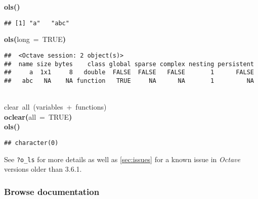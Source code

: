 \documentclass[english,10pt,a4paper]{article}\usepackage{graphicx, color}
\makeatletter
\newcommand{\hlnumber}[1]{\textcolor[rgb]{0,0,0}{#1}}%
\newcommand{\hlfunctioncall}[1]{\textcolor[rgb]{0.501960784313725,0,0.329411764705882}{\textbf{#1}}}%
\newcommand{\hlkeyword}[1]{\textcolor[rgb]{0,0,0}{\textbf{#1}}}%
\newcommand{\hlargument}[1]{\textcolor[rgb]{0.690196078431373,0.250980392156863,0.0196078431372549}{#1}}%
\newcommand{\hlcomment}[1]{\textcolor[rgb]{0.180392156862745,0.6,0.341176470588235}{#1}}%
\newcommand{\hlstd}[1]{\textcolor[rgb]{0,0,0}{#1}}%
\newenvironment{kframe}{%
 \def\FrameCommand##1{\hskip\@totalleftmargin \hskip-\fboxsep
 \colorbox{shadecolor}{##1}\hskip-\fboxsep
     \hskip-\linewidth \hskip-\@totalleftmargin \hskip\columnwidth}%
 \MakeFramed {\advance\hsize-\width
   \@totalleftmargin\z@ \linewidth\hsize
   \@setminipage}}%
 {\par\unskip\endMakeFramed}
\newenvironment{knitrout}{}{} %
\let\proglang=\textit
\let\code=\texttt
\newcommand{\octave}{\proglang{Octave}\xspace}
\makeatother
\begin{document}
\begin{knitrout}
\color{fgcolor}\begin{kframe}
\begin{flushleft}
\ttfamily\noindent
\hlfunctioncall{o\usebox{\hlnormalsizeboxunderscore}ls}\hlkeyword{(}\hlkeyword{)}\mbox{}
\normalfont
\end{flushleft}
\begin{verbatim}
## [1] "a"   "abc"
\end{verbatim}
\begin{flushleft}
\ttfamily\noindent
\hlfunctioncall{o\usebox{\hlnormalsizeboxunderscore}ls}\hlkeyword{(}\hlargument{long}{\ }\hlargument{=}{\ }\hlnumber{TRUE}\hlkeyword{)}\mbox{}
\normalfont
\end{flushleft}
\begin{verbatim}
##  <Octave session: 2 object(s)>
##  name size bytes    class global sparse complex nesting persistent
##     a  1x1     8   double  FALSE  FALSE   FALSE       1      FALSE
##   abc   NA    NA function   TRUE     NA      NA       1         NA
\end{verbatim}
\begin{flushleft}
\ttfamily\noindent
\hspace*{\fill}\\
\hlstd{}\hlcomment{\usebox{\hlnormalsizeboxhash}{\ }clear{\ }all{\ }(variables{\ }+{\ }functions)}\hspace*{\fill}\\
\hlstd{}\hlfunctioncall{o\usebox{\hlnormalsizeboxunderscore}clear}\hlkeyword{(}\hlargument{all}{\ }\hlargument{=}{\ }\hlnumber{TRUE}\hlkeyword{)}\hspace*{\fill}\\
\hlstd{}\hlfunctioncall{o\usebox{\hlnormalsizeboxunderscore}ls}\hlkeyword{(}\hlkeyword{)}\mbox{}
\normalfont
\end{flushleft}
\begin{verbatim}
## character(0)
\end{verbatim}
\end{kframe}
\end{knitrout}


See \code{?o\_ls} for more details as well as \cref{sec:issues} for a
known issue in \octave versions older than 3.6.1.

\subsubsection{Browse documentation}
\end{document}
